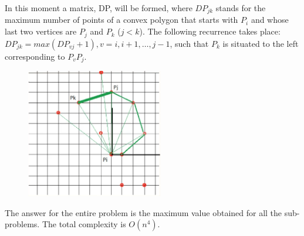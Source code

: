 \documentclass[letterpaper]{article}
\begin{document}
In this moment a matrix, DP, will be formed, where $DP_{jk}$ stands for the maximum number of points of a convex polygon that starts with $P_i$ and whose last two vertices are $P_j$ and $P_k$ ($j < k$).
The following recurrence takes place: $DP_{jk} = max(DP_{vj} + 1), v = i, i + 1, \dots, j - 1$, such that $P_k$ is situated to the left corresponding to $P_v P_j$.

\begin{figure} [h!]
\centering
\includegraphics[width=0.53\textwidth]{pngOfDiagrams/minnumberofverticesDP3.png}
\end{figure}

The answer for the entire problem is the maximum value obtained for all the sub-problems. The total complexity is $O(n^4)$.
\end{document}
